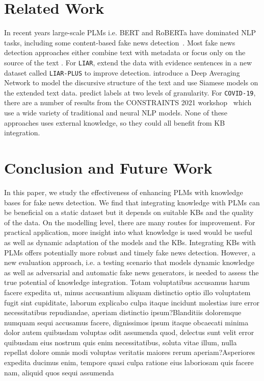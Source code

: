 \documentclass[letterpaper]{article} %
\begin{document}
\vspace{-3.21mm}
\section{Related Work}

In recent years large-scale PLMs i.e. BERT and RoBERTa have dominated NLP tasks, including some content-based fake news detection~\cite{Kaliyar2021FakeBERT}.
Most fake news detection approaches either combine text with metadata \citep[e.g.][]{ding2020bert} or focus only on the source of the text \citep[e.g.][]{gruppi2022nela}.
For \texttt{LIAR}, \citet{alhindi-etal-2018-evidence} extend the data with evidence sentences in a new dataset called \texttt{LIAR-PLUS} to improve detection.
\citet{Chernyavskiy2020RecursiveNT} introduce a Deep Averaging Network to model the discursive structure of the text and use Siamese models on the extended text data.
\citet{Liu2019ATM} predict labels at two levels of granularity.
For \texttt{COVID-19}, there are a number of results from the CONSTRAINTS 2021 workshop~\cite{chakraborty2021combating} which use a wide variety of traditional and neural NLP models.
None of these approaches uses external knowledge, so they could all benefit from KB integration.


\section{Conclusion and Future Work}

In this paper, we study the effectiveness of enhancing PLMs with knowledge bases for fake news detection.
We find that integrating knowledge with PLMs can be beneficial on a static dataset but it depends on suitable KBs and the quality of the data.
On the modelling level, there are many routes for improvement.
For practical application, more insight into what knowledge is used would be useful as well as dynamic adaptation of the models and the KBs.
Integrating KBs with PLMs offers potentially more robust and timely fake news detection. However, a new evaluation approach, i.e. a testing scenario that models dynamic knowledge as well as adversarial and automatic fake news generators, is needed to assess the true potential of knowledge integration.  Totam voluptatibus accusamus harum facere expedita ut, minus accusantium aliquam distinctio optio illo voluptatem fugit sint cupiditate, laborum explicabo culpa itaque incidunt molestias iure error necessitatibus repudiandae, aperiam distinctio ipsum?Blanditiis doloremque numquam sequi accusamus facere, dignissimos ipsum itaque obcaecati minima dolor autem quibusdam voluptas odit assumenda quod, delectus sunt velit error quibusdam eius nostrum quis enim necessitatibus, soluta vitae illum, nulla repellat dolore omnis modi voluptas veritatis maiores rerum aperiam?Asperiores expedita ducimus enim, tempore quasi culpa ratione eius laboriosam quis facere nam, aliquid quos sequi assumenda

\end{document}
